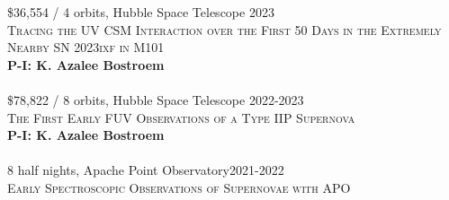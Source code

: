 \documentclass[10pt]{cv}
\begin{document}
\begin{llist}
\vspace{-0.1in}
\$36,554 / 4 orbits, Hubble Space Telescope \hfill 2023\\
\textsc{Tracing the UV CSM Interaction over the First 50 Days in the Extremely Nearby SN 2023ixf in M101}\\
\textbf{P-I: K. Azalee Bostroem}\\
\\   
\$78,822 / 8 orbits, Hubble Space Telescope \hfill 2022-2023\\
\textsc{The First Early FUV Observations of a Type IIP Supernova}\\
\textbf{P-I: K. Azalee Bostroem}\\
\\   
8 half nights, Apache Point Observatory\hfill 2021-2022\\
\textsc{Early Spectroscopic Observations of Supernovae with APO}\\

\end{llist}
\end{document}

